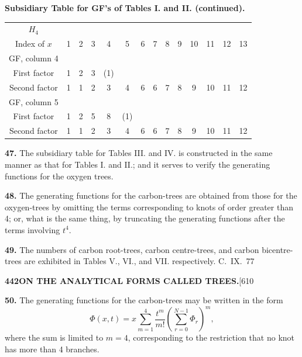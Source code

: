 \documentclass[11pt,a4paper]{article}
\begin{document}
{\noindent\textbf{Subsidiary Table for GF's of Tables I. and II. (continued).}

\begin{center}
\small
\begin{tabular}{|c|c|c|c|c|c|c|c|c|c|c|c|c|c|}
\hline
$H_4$ & & & & & & & & & & & & & \\
Index of $x$ & 1 & 2 & 3 & 4 & 5 & 6 & 7 & 8 & 9 & 10 & 11 & 12 & 13 \\
\hline
GF, column 4 & & & & & & & & & & & & & \\
First factor & 1 & 2 & 3 & (1) & & & & & & & & & \\
Second factor & 1 & 1 & 2 & 3 & 4 & 6 & 6 & 7 & 8 & 9 & 10 & 11 & 12 \\
\hline
GF, column 5 & & & & & & & & & & & & & \\
First factor & 1 & 2 & 5 & 8 & (1) & & & & & & & & \\
Second factor & 1 & 1 & 2 & 3 & 4 & 6 & 6 & 7 & 8 & 9 & 10 & 11 & 12 \\
\hline
\end{tabular}
\end{center}

\medskip
\noindent\textbf{47.}
The subsidiary table for Tables III. and IV. is constructed in the same manner as that for Tables I. and II.; and it serves to verify the generating functions for the oxygen trees.

\medskip
\noindent\textbf{48.}
The generating functions for the carbon-trees are obtained from those for the oxygen-trees by omitting the terms corresponding to knots of order greater than 4; or, what is the same thing, by truncating the generating functions after the terms involving $t^4$.

\medskip
\noindent\textbf{49.}
The numbers of carbon root-trees, carbon centre-trees, and carbon bicentre-trees are exhibited in Tables V., VI., and VII. respectively.
\hfill C.~IX.\ 77

\newpage
\noindent\textbf{442}\hspace{\fill}\textbf{ON THE ANALYTICAL FORMS CALLED TREES.}\hspace{\fill}[610

\noindent\textbf{50.}
The generating functions for the carbon-trees may be written in the form
\[
\Phi(x,t) = x\sum_{m=1}^{4} \frac{t^m}{m!} \left(\sum_{r=0}^{N-1} \Phi_r\right)^m,
\]
where the sum is limited to $m = 4$, corresponding to the restriction that no knot has more than 4 branches.

}
\end{document}
